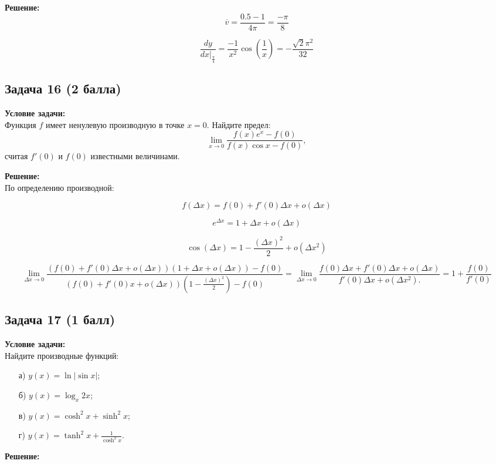 \documentclass[a4paper,12pt]{article}
\begin{document}
\textbf{Решение:} \\

\[
\overline{v} = \frac{0.5 - 1}{4\pi} = \frac{-\pi}{8}
\]

\[
\frac{dy}{dx|_{\frac{\pi}{4}}} = \frac{-1}{x^2}\cos(\frac{1}{x}) = -\frac{\sqrt{2}\pi^2}{32}
\]

\vspace{1cm}

\subsection{Задача 16 (2 балла)}
\textbf{Условие задачи:} \\
Функция \( f \) имеет ненулевую производную в точке \( x = 0 \). Найдите предел:
\[
\lim_{x \to 0} \frac{f(x)e^x - f(0)}{f(x) \cos x - f(0)},
\]
считая \( f'(0) \) и \( f(0) \) известными величинами.

\textbf{Решение:} \\
По определению производной:

\[
f(\Delta x) = f(0) + f'(0)\Delta x + o(\Delta x)
\]

\[
e^{\Delta x} = 1 + \Delta x + o(\Delta x)
\]

\[
\cos(\Delta x) = 1 - \frac{(\Delta x)^2}{2} + o(\Delta x^2)
\]


\[
\lim_{\Delta x \to 0} \frac{(f(0)+f ′(0)\Delta x+o(\Delta x))(1+\Delta x+o( \Delta x))−f(0)}{(f(0)+f′(0)x+o(\Delta x))(1− \frac{(\Delta x)^2}{2})−f(0)} = \lim_{\Delta x \to 0} \frac{f(0)\Delta x+f′(0)\Delta x+o(\Delta x)}{f′(0)\Delta x+o(\Delta x^2).} = 1 + \frac{f(0)}{f'(0)}
\]

\vspace{1cm}

\subsection{Задача 17 (1 балл)}
\textbf{Условие задачи:} \\
Найдите производные функций:
\begin{itemize}
    \item[а)] \( y(x) = \ln |\sin x| \);
    \item[б)] \( y(x) = \log_x 2x \);
    \item[в)] \( y(x) = \cosh^2 x + \sinh^2 x \);
    \item[г)] \( y(x) = \tanh^2 x + \frac{1}{\cosh^2 x} \).
\end{itemize}

\textbf{Решение:} \\
\end{document}
